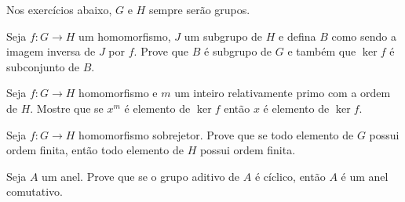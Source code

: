 Nos exercícios abaixo, $G$ e $H$ sempre serão grupos.

\begin{exercise}
Seja $f:G \to H$ um homomorfismo, $J$ um subgrupo de $H$ e defina $B$ como sendo a imagem inversa de $J$ por $f$.
Prove que $B$ é subgrupo de $G$ e também que $\ker f$ é subconjunto de $B$.
\end{exercise}

\begin{exercise}
Seja $f:G \to H$ homomorfismo e $m$ um inteiro relativamente primo com a ordem de $H$.
Mostre que se $x^m$ é elemento de $\ker f$ então $x$ é elemento de $\ker f$.
\end{exercise}

\begin{exercise}
Seja $f:G \to H$ homomorfismo sobrejetor. Prove que se todo elemento de $G$ possui ordem finita, então todo elemento de $H$ possui ordem finita.
\end{exercise}

\begin{exercise}
Seja $A$ um anel.
Prove que se o grupo aditivo de $A$ é cíclico, então $A$ é um anel comutativo.
\end{exercise}
